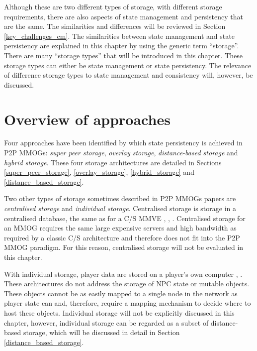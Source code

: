 Although these are two different types of storage, with different storage requirements, there are also aspects of state management and persistency that are the same. The similarities and differences will be reviewed in Section \ref{key_challenges_cm}. The similarities between state management and state persistency are explained in this chapter by using the generic term ``storage''. There are many ``storage types'' that will be introduced in this chapter. These storage types can either be state management or state persistency. The relevance of difference storage types to state management and consistency will, however, be discussed.

\section{Overview of approaches}
\label{storage_type_overview}

Four approaches have been identified by which state persistency is achieved in P2P MMOGs: \emph{super peer storage}, \emph{overlay storage}, \emph{distance-based storage} and \emph{hybrid storage}. These four storage architectures are detailed in Sections \ref{super_peer_storage}, \ref{overlay_storage}, \ref{hybrid_storage} and \ref{distance_based_storage}.

Two other types of storage sometimes described in P2P MMOGs papers are \emph{centralised storage} and \emph{individual storage}. Centralised storage is storage in a centralised database, the same as for a C/S MMVE \cite{badumna_engine}, \cite{rooney_centralised_storage}, \cite{hybrid_p2p_cs_centralised}. Centralised storage for an MMOG requires the same large expensive servers and high bandwidth as required by a classic C/S architecture and therefore does not fit into the P2P MMOG paradigm. For this reason, centralised storage will not be evaluated in this chapter.

With individual storage, player data are stored on a player's own computer \cite{individual_storage1}, \cite{cheat_proof_playout}. These
architectures do not address the storage of NPC state or mutable objects. These objects cannot be as easily mapped to a single node in the network as
player state can and, therefore, require a mapping mechanism to decide where to host these objects. Individual storage will not be explicitly discussed
in this chapter, however, individual storage can be regarded as a subset of distance-based storage, which will be discussed in detail in Section
\ref{distance_based_storage}.

